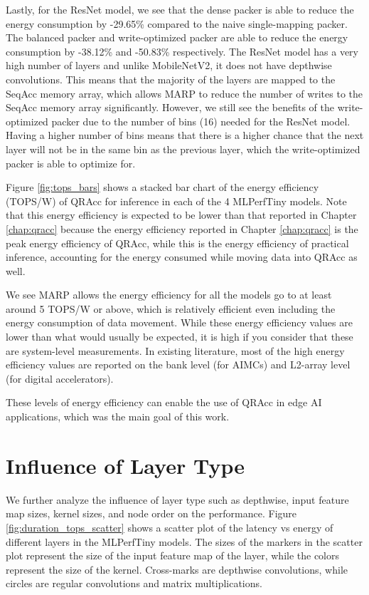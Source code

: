 Lastly, for the ResNet model, we see that the dense packer is able to reduce the energy consumption by -29.65\% compared to the naive single-mapping packer. The balanced packer and write-optimized packer are able to reduce the energy consumption by -38.12\% and -50.83\% respectively. The ResNet model has a very high number of layers and unlike MobileNetV2, it does not have depthwise convolutions. This means that the majority of the layers are mapped to the SeqAcc memory array, which allows MARP to reduce the number of writes to the SeqAcc memory array significantly. However, we still see the benefits of the write-optimized packer due to the number of bins (16) needed for the ResNet model. Having a higher number of bins means that there is a higher chance that the next layer will not be in the same bin as the previous layer, which the write-optimized packer is able to optimize for.

Figure \ref{fig:tops_bars} shows a stacked bar chart of the energy efficiency (TOPS/W) of QRAcc for inference in each of the 4 MLPerfTiny models. Note that this energy efficiency is expected to be lower than that reported in Chapter \ref{chap:qracc} because the energy efficiency reported in Chapter \ref{chap:qracc} is the peak energy efficiency of QRAcc, while this is the energy efficiency of practical inference, accounting for the energy consumed while moving data into QRAcc as well.

We see MARP allows the energy efficiency for all the models go to at least around 5 TOPS/W or above, which is relatively efficient even including the energy consumption of data movement. While these energy efficiency values are lower than what would usually be expected, it is high if you consider that these are system-level measurements. In existing literature, most of the high energy efficiency values are reported on the bank level (for AIMCs) and L2-array level (for digital accelerators). 

These levels of energy efficiency can enable the use of QRAcc in edge AI applications, which was the main goal of this work. 

\section{Influence of Layer Type}

We further analyze the influence of layer type such as depthwise, input feature map sizes, kernel sizes, and node order on the performance. Figure \ref{fig:duration_tops_scatter} shows a scatter plot of the latency vs energy of different layers in the MLPerfTiny models. The sizes of the markers in the scatter plot represent the size of the input feature map of the layer, while the colors represent the size of the kernel. Cross-marks are depthwise convolutions, while circles are regular convolutions and matrix multiplications.


